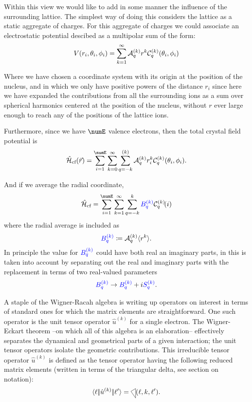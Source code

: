 \documentclass{article}
\begin{document}
Within this view we would like to add in some manner the influence of the surrounding lattice. The simplest way of doing this considers the lattice as a static aggregate of charges. For this aggregate of charges we could associate an electrostatic potential descibed as a multipolar sum of the form:  
\begin{equation}   
V(r_i, \theta_i, \phi_i) = \sum_{k=1}^\infty \mathcal{A}^{(k)}_q r^k \mathcal{C}^{(k)}_q(\theta_i, \phi_i) 
\end{equation}  

Where we have chosen a coordinate system with its origin at the position of the nucleus, and in which we only have positive powers of the distance $r_i$ since here we have expanded the contributions from all the surrounding ions as a sum over spherical harmonics centered at the position of the nucleus, without $r$ ever large enough to reach any of the positions of the lattice ions. 

Furthermore, since we have $\numE$ valence electrons, then the total crystal field potential is 
\begin{equation}
    \hamCrystalFieldSymbol(\vec{r}) = \sum_{i=1}^\numE \sum_{k=0}^\infty \sum_{q=-k}^{(k)} \Akq r_i^k \Ckq(\theta_i,\phi_i).
\end{equation}

And if we average the radial coordinate,
\begin{equation}
    \hamCrystalFieldSymbol = \sum_{i=1}^\numE \sum_{k=1}^\infty \sum_{q=-k}^{k} \Bkq {\Ckq}\!(i) 
\end{equation}
where the radial average is included as
\begin{equation}
\textcolor{blue}{B^{(k)}_q} \coloneqq \mathcal{A}^{(k)}_q {\langle r^k \rangle}.
\end{equation}
In principle the value for $\textcolor{blue}{B^{(k)}_q}$ could have both real an imaginary parts, in \qlanth this is taken into account by separating out the real and imaginary parts with the replacement in terms of two real-valued parameters
\begin{equation}
\textcolor{blue}{B^{(k)}_q} \rightarrow \textcolor{blue}{B^{(k)}_q} + i \textcolor{blue}{S^{(k)}_q}.
\end{equation}

A staple of the Wigner-Racah algebra is writing up operators on interest in terms of standard ones for which the matrix elements are straightforward.  One such operator is the unit tensor operator $\hat{u}^{(k)}$ for a single electron. The Wigner-Eckart theorem --on which all of this algebra is an elaboration-- effectively separates the dynamical and geometrical parts of a given interaction; the unit tensor operators isolate the geometric contributions. This irreducible tensor operator $\hat{u}^{(k)}$ is defined as the tensor operator having the following reduced matrix elements (written in terms of the triangular delta, see section on notation):
\begin{equation}
\redbraopket{\ell}{\hat{u}^{(k)}}{\ell'} = \tricondition{\ell,k,\ell'}.
\end{equation}
\end{document}

